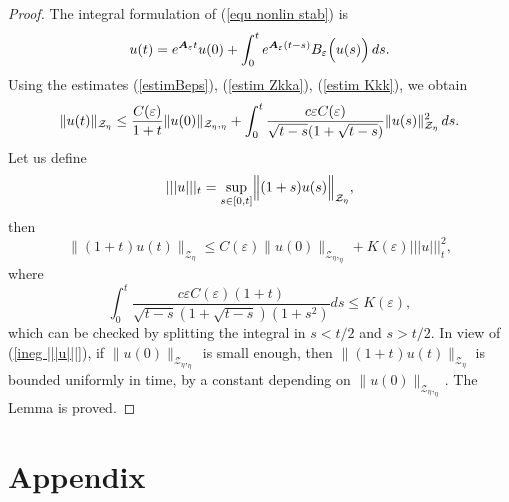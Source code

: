 \documentclass[11pt]{article}
\begin{document}
\begin{proof} 
The integral formulation of (\ref{equ nonlin stab}) is%
\begin{equation}
u(t)=e^{\boldsymbol{A}_{\varepsilon }t}u(0)+\int_{0}^{t}e^{\boldsymbol{A}%
_{\varepsilon }(t-s)}B_{\varepsilon } \Bigl( u(s) \Bigr) \, ds. \label{integ form a}
\end{equation}%
Using the estimates (\ref{estimBeps}), (\ref{estim Zkka}),  (\ref{estim Kkk}),
we obtain 
\begin{equation}
\|u(t)\|_{\mathcal{Z}_{\eta}}\leq \frac{C(\varepsilon )}{1+t}\|u(0)\|_{%
\mathcal{Z}_{\eta},_{\eta}}+\int_{0}^{t}\frac{c\varepsilon C(\varepsilon )}{\sqrt{%
t-s}(1 + \sqrt{t-s})}\|u(s)\|_{\mathcal{Z}_{\eta}}^{2} \, ds.  \label{estim nonlin a}
\end{equation}%
Let us define 
\begin{equation*}
|||u|||_{t}=\underset{s\in \lbrack 0,t]}{\sup } \Bigl\|(1+s)u(s) \Bigr\|_{\mathcal{Z}_\eta},
\end{equation*}%
then%
\begin{equation}
\|(1+t^{ })u(t)\|_{\mathcal{Z}_\eta} \leq C(\varepsilon )%
\|u(0)\|_{\mathcal{Z}_{\eta},_{\eta}}+K(\varepsilon )
|||u|||_{t}^{2},  \label{ineg |||u|||}
\end{equation}%
where 
\begin{equation}
\int_{0}^{t}\frac{c\varepsilon C(\varepsilon ) (1 + t)}{\sqrt{t-s}%
(1+\sqrt{t-s})(1 + s^2)} ds \leq K(\varepsilon ),
\label{estim integ}
\end{equation}%
which can be checked by splitting the integral in $s < t/2$ and $s > t/2$.
In view of (\ref{ineg |||u|||}), if $\|u(0)\|_{\mathcal{Z}_{\eta},_{\eta}}$ is small enough, then $\|(1+t^{ })u(t)\|_{\mathcal{Z}_\eta}$ is bounded uniformly in time, by a constant depending on 
$\|u(0)\|_{\mathcal{Z}_{\eta},_{\eta}}$.
The Lemma is proved. 
\end{proof}






\section{Appendix}





\end{document}
